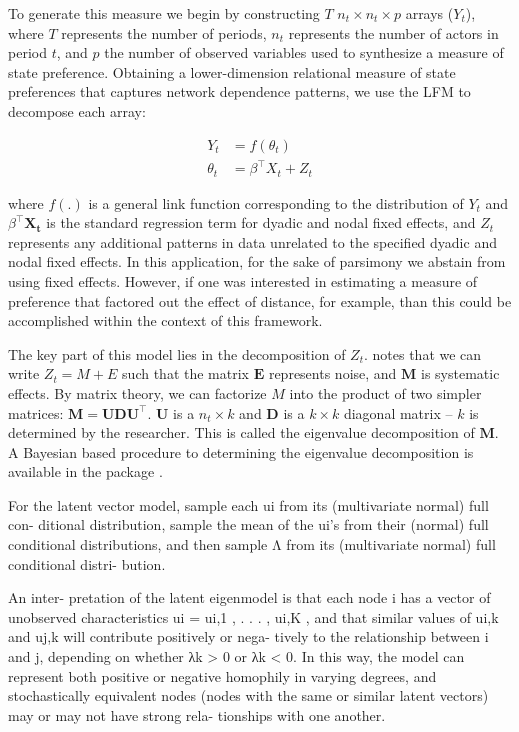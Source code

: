 To generate this measure we begin by constructing $T$ $n_{t} \times n_{t} \times p$ arrays ($Y_{t}$), where $T$ represents the number of periods, $n_{t}$ represents the number of actors in period $t$, and $p$ the number of observed variables used to synthesize a measure of state preference. Obtaining a lower-dimension relational measure of state preferences that captures network dependence patterns, we use the LFM to decompose each array: 

\begin{align*}
	Y_{t} &= f(\theta_{t})\\
	\theta_{t} &= \beta^{\top} X_{t} + Z_{t}
\end{align*}

where $f(.)$ is a general link function corresponding to the distribution of $Y_{t}$ and $\beta^{\top}\mathbf{X_{t}}$ is the standard regression term for dyadic and nodal fixed effects, and $Z_{t}$ represents any additional patterns in data unrelated to the specified dyadic and nodal fixed effects. In this application, for the sake of parsimony we abstain from using fixed effects. However, if one was interested in estimating a measure of preference that factored out the effect of distance, for example, than this could be accomplished within the context of this framework. 

The key part of this model lies in the decomposition of $Z_{t}$. \citet{hoff:2009} notes that we can write $Z_{t} = M + E$ such that the matrix $\mathbf{E}$ represents noise, and $\mathbf{M}$ is systematic effects. By matrix theory, we can factorize $M$ into the product of two simpler matrices: $\mathbf{M} = \mathbf{UDU^{\top}}$. $\mathbf{U}$ is a $n_{t} \times k$ and $\mathbf{D}$ is a $k \times k$ diagonal matrix -- $k$ is determined by the researcher. This is called the eigenvalue decomposition of $\mathbf{M}$. A Bayesian based procedure to determining the eigenvalue decomposition is available in the   package \citep{amenpkg}. 

For the latent vector model, sample each ui from its (multivariate normal) full con- ditional distribution, sample the mean of the ui’s from their (normal) full conditional distributions, and then sample Λ from its (multivariate normal) full conditional distri- bution.

An inter- pretation of the latent eigenmodel is that each node i has a vector of unobserved characteristics ui = {ui,1 , . . . , ui,K }, and that similar values of ui,k and uj,k will contribute positively or nega- tively to the relationship between i and j, depending on whether λk > 0 or λk < 0. In this way, the model can represent both positive or negative homophily in varying degrees, and stochastically equivalent nodes (nodes with the same or similar latent vectors) may or may not have strong rela- tionships with one another.



